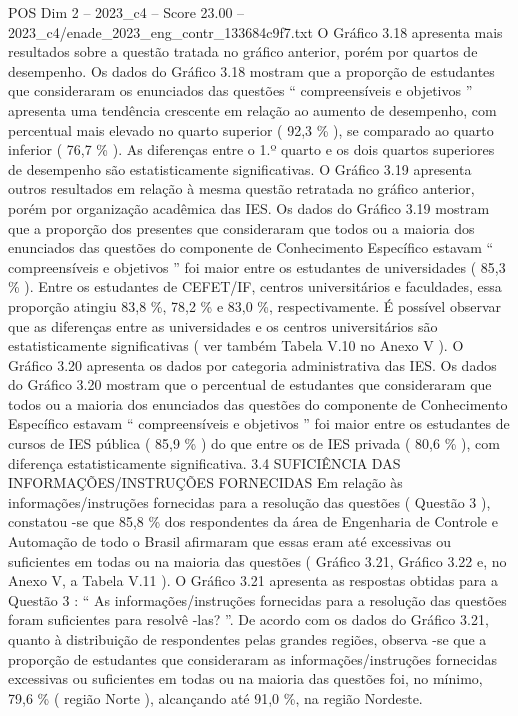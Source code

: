 \begin{textsample}{POS Dim 2 – 2023\_c4 – Score 23.00 – 2023\_c4/enade\_2023\_eng\_contr\_133684c9f7.txt}
O Gráfico 3.18 apresenta mais resultados sobre a questão tratada no gráfico anterior, porém por quartos de desempenho.
Os dados do Gráfico 3.18 mostram que a proporção de estudantes que consideraram os enunciados das questões “ compreensíveis e objetivos ” apresenta uma tendência crescente em relação ao aumento de desempenho, com percentual mais elevado no quarto superior ( 92,3 \% ), se comparado ao quarto inferior ( 76,7 \% ).
As diferenças entre o 1.º quarto e os dois quartos superiores de desempenho são estatisticamente significativas.
O Gráfico 3.19 apresenta outros resultados em relação à mesma questão retratada no gráfico anterior, porém por organização acadêmica das IES.
Os dados do Gráfico 3.19 mostram que a proporção dos presentes que consideraram que todos ou a maioria dos enunciados das questões do componente de Conhecimento Específico estavam “ compreensíveis e objetivos ” foi maior entre os estudantes de universidades ( 85,3 \% ).
Entre os estudantes de CEFET/IF, centros universitários e faculdades, essa proporção atingiu 83,8 \%, 78,2 \% e 83,0 \%, respectivamente.
É possível observar que as diferenças entre as universidades e os centros universitários são estatisticamente significativas ( ver também Tabela V.10 no Anexo V ).
O Gráfico 3.20 apresenta os dados por categoria administrativa das IES.
Os dados do Gráfico 3.20 mostram que o percentual de estudantes que consideraram que todos ou a maioria dos enunciados das questões do componente de Conhecimento Específico estavam “ compreensíveis e objetivos ” foi maior entre os estudantes de cursos de IES pública ( 85,9 \% ) do que entre os de IES privada ( 80,6 \% ), com diferença estatisticamente significativa. 3.4 SUFICIÊNCIA DAS INFORMAÇÕES/INSTRUÇÕES FORNECIDAS Em relação às informações/instruções fornecidas para a resolução das questões ( Questão 3 ), constatou -se que 85,8 \% dos respondentes da área de Engenharia de Controle e Automação de todo o Brasil afirmaram que essas eram até excessivas ou suficientes em todas ou na maioria das questões ( Gráfico 3.21, Gráfico 3.22 e, no Anexo V, a Tabela V.11 ).
O Gráfico 3.21 apresenta as respostas obtidas para a Questão 3 : “ As informações/instruções fornecidas para a resolução das questões foram suficientes para resolvê -las? ”.
De acordo com os dados do Gráfico 3.21, quanto à distribuição de respondentes pelas grandes regiões, observa -se que a proporção de estudantes que consideraram as informações/instruções fornecidas excessivas ou suficientes em todas ou na maioria das questões foi, no mínimo, 79,6 \% ( região Norte ), alcançando até 91,0 \%, na região Nordeste.

\end{textsample}
